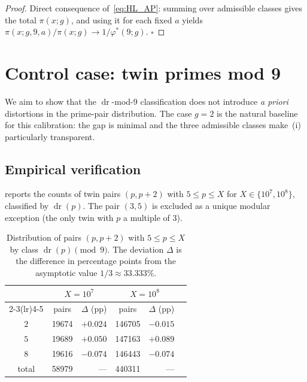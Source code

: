 \documentclass[11pt]{amsart}
\theoremstyle{plain}
\theoremstyle{definition}
\theoremstyle{remark}
\DeclareMathOperator{\dr}{dr}
\begin{document}
\begin{proof}
Direct consequence of~\eqref{eq:HL_AP}: summing over admissible classes
gives the total $\pi(x;g)$, and using it for each fixed $a$ yields
$\pi(x;g,9,a)/\pi(x;g) \to 1/\varphi^*(9;g)$. $\square$
\end{proof}

\section{Control case: twin primes mod 9}\label{sec:twins}

We aim to show that the $\dr$-mod-$9$ classification does not introduce
\emph{a priori} distortions in the prime-pair distribution. The case
$g=2$ is the natural baseline for this calibration: the gap is minimal
and the three admissible classes make
\,(i) particularly transparent.

\subsection{Empirical verification}

 reports the counts of twin pairs $(p,p+2)$ with
$5 \le p \le X$ for $X \in \{10^7, 10^8\}$, classified by $\dr(p)$.
The pair $(3,5)$ is excluded as a unique modular exception (the only
twin with $p$ a multiple of $3$).

\begin{table}[h]
\centering
\caption{Distribution of pairs $(p,p+2)$ with $5 \le p \le X$ by class
$\dr(p) \pmod 9$. The deviation $\Delta$ is the difference in
percentage points from the asymptotic value $1/3 \approx 33.333\%$.}
\label{tab:twins}
\begin{tabular}{@{}c r r r r r@{}}
\toprule
\multicolumn{1}{c}{}
& \multicolumn{2}{c}{$X = 10^7$}
& \multicolumn{2}{c}{$X = 10^8$} \\
\cmidrule(lr){2-3}\cmidrule(lr){4-5}
\multicolumn{1}{c}{class $a$}
& \multicolumn{1}{c}{pairs}
& \multicolumn{1}{c}{$\Delta$ (pp)}
& \multicolumn{1}{c}{pairs}
& \multicolumn{1}{c}{$\Delta$ (pp)} \\
\midrule
$2$ & \num{19674}  & $+0.024$ & \num{146705} & $-0.015$ \\
$5$ & \num{19689}  & $+0.050$ & \num{147163} & $+0.089$ \\
$8$ & \num{19616}  & $-0.074$ & \num{146443} & $-0.074$ \\
\midrule
total & \num{58979} & --- & \num{440311} & --- \\
\bottomrule
\end{tabular}
\end{table}
\end{document}
